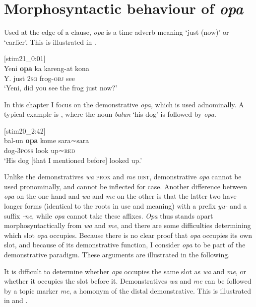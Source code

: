 \documentclass[output=paper,colorlinks,citecolor=brown]{langscibook}
\begin{document}
\section{Morphosyntactic behaviour of \textit{opa}}
\label{sec:morph}
Used at the edge of a clause, \textit{opa} is a time adverb meaning `just (now)' or `earlier'. This is illustrated in .

	\ea 	\label{exe:opain} [stim21\_0:01]\\	
		Yeni \textbf{opa} ka kareng-at kona\\
		Y. just \textsc{2sg} frog-\textsc{obj} see\\	
		\glt`Yeni, did you see the frog just now?' 
	\z 

In this chapter I focus on the demonstrative \textit{opa}, which is used adnominally. A typical example is , where the noun \textit{balun} `his dog' is followed by \textit{opa}. 

	\ea	\label{exe:opatyp} [stim20\_2:42]\\
	\gll bal-un \textbf{opa} kome sara∼sara\\
		dog-\textsc{3poss} {\glopa} look up∼\textsc{red}\\	
	\glt	`His dog [that I mentioned before] looked up.' 
	\z 
	
Unlike the demonstratives \textit{wa} \textsc{prox} and \textit{me} \textsc{dist}, demonstrative \textit{opa} cannot be used pronominally, and cannot be inflected for case. Another difference between \textit{opa} on the one hand and \textit{wa} and \textit{me} on the other is that the latter two have longer forms (identical to the roots in use and meaning) with a prefix \textit{yu-} and a suffix \textit{-ne}, while \textit{opa} cannot take these affixes. \textit{Opa} thus stands apart morphosyntactically from \textit{wa} and \textit{me}, and there are some difficulties determining which slot \textit{opa} occupies. Because there is no clear proof that \textit{opa} occupies its own slot, and because of its demonstrative function, I consider \textit{opa} to be part of the demonstrative paradigm. These arguments are illustrated in the following.

It is difficult to determine whether \textit{opa} occupies the same slot as \textit{wa} and \textit{me}, or whether it occupies the slot before it. Demonstratives \textit{wa} and \textit{me} can be followed by a topic marker \textit{me}, a homonym of the distal demonstrative. This is illustrated in  and .
\end{document}
